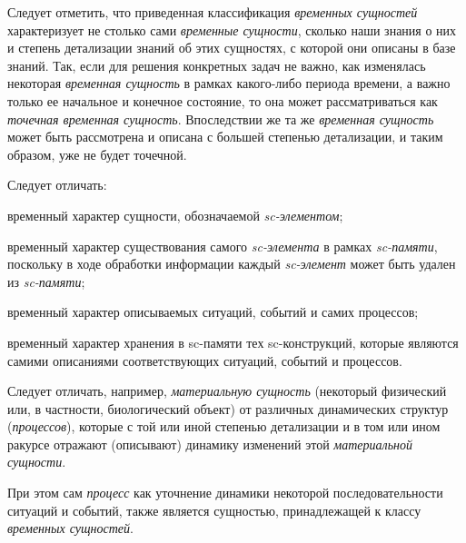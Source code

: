 Следует отметить, что приведенная классификация \textit{временных сущностей} характеризует не столько сами \textit{временные сущности}, сколько наши знания о них и степень детализации знаний об этих сущностях, с которой они описаны в базе знаний.
Так, если для решения конкретных задач не важно, как изменялась некоторая \textit{временная сущность} в рамках какого-либо периода времени, а важно только ее начальное и конечное состояние, то она может рассматриваться как \textit{точечная временная сущность}.
Впоследствии же та же \textit{временная сущность} может быть рассмотрена и описана с большей степенью детализации, и таким образом, уже не будет точечной.

Следует отличать:
	\begin{textitemize}
		\item временный характер сущности, обозначаемой \textit{sc-элементом};
		\item временный характер существования самого \textit{sc-элемента} в рамках \textit{sc-памяти}, поскольку в ходе обработки информации каждый \textit{sc-элемент} может быть удален из \textit{sc-памяти}; 
		\item временный характер описываемых ситуаций, событий и самих процессов;
		\item временный характер хранения в sc-памяти тех sc-конструкций, которые являются самими описаниями соответствующих ситуаций, событий и процессов.
	\end{textitemize}

Следует отличать, например, \textit{материальную сущность} (некоторый физический или, в частности, биологический объект) от различных динамических структур (\textit{процессов}), которые с той или иной степенью детализации и в том или ином ракурсе отражают (описывают) динамику изменений этой \textit{материальной сущности}. 
			
При этом сам \textit{процесс} как уточнение динамики некоторой последовательности ситуаций и событий, также является сущностью, принадлежащей к классу \textit{временных сущностей}.

